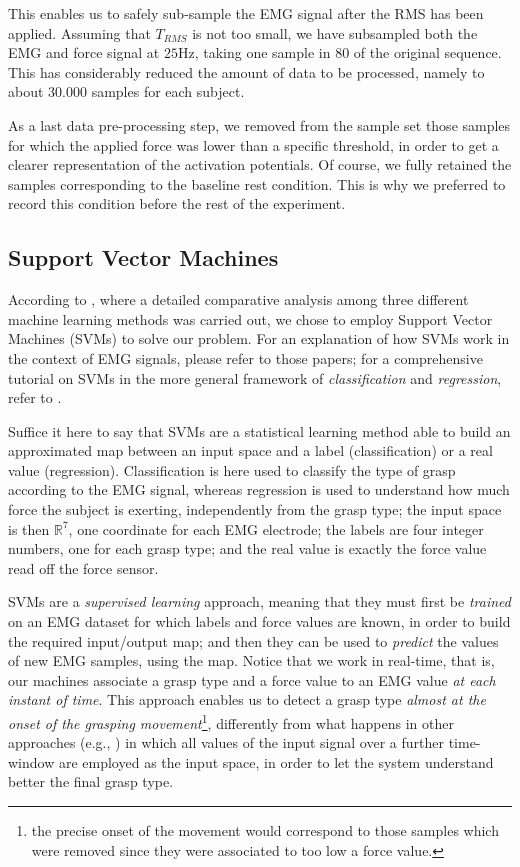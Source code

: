 \documentclass[10pt]{bmc_article}
\newenvironment{bmcformat}{\begin{raggedright}\baselineskip20pt\sloppy\setboolean{publ}{false}}{\end{raggedright}\baselineskip20pt\sloppy}
\def\RR{\mathbb{R}}
\begin{document}
\begin{bmcformat}
This enables us to safely sub-sample the EMG signal after the RMS has
been applied. Assuming that $T_{RMS}$ is not too small, we have
subsampled both the EMG and force signal at $25$Hz, taking one sample
in $80$ of the original sequence. This has considerably reduced the
amount of data to be processed, namely to about $30.000$ samples for
each subject.

As a last data pre-processing step, we removed from the sample set
those samples for which the applied force was lower than a specific
threshold, in order to get a clearer representation of the activation
potentials. Of course, we fully retained the samples corresponding to
the baseline rest condition. This is why we preferred to record this
condition before the rest of the experiment.

\subsection*{Support Vector Machines}

According to \cite{2008.ICRA,2008.BioCyb}, where a detailed
comparative analysis among three different machine learning methods
was carried out, we chose to employ Support Vector Machines (SVMs) to
solve our problem. For an explanation of how SVMs work in the context
of EMG signals, please refer to those papers; for a comprehensive
tutorial on SVMs in the more general framework of
\emph{classification} and \emph{regression}, refer to
\cite{Burges98,SmolaTut2004}.

Suffice it here to say that SVMs are a statistical learning method
able to build an approximated map between an input space and a label
(classification) or a real value (regression). Classification is here
used to classify the type of grasp according to the EMG signal,
whereas regression is used to understand how much force the subject is
exerting, independently from the grasp type; the input space is then
$\RR^7$, one coordinate for each EMG electrode; the labels are four
integer numbers, one for each grasp type; and the real value is
exactly the force value read off the force sensor.

SVMs are a \emph{supervised learning} approach, meaning that they must
first be \emph{trained} on an EMG dataset for which labels and force
values are known, in order to build the required input/output map; and
then they can be used to \emph{predict} the values of new EMG samples,
using the map. Notice that we work in real-time, that is, our machines
associate a grasp type and a force value to an EMG value \emph{at each
instant of time}. This approach enables us to detect a grasp type
\emph{almost at the onset of the grasping movement}\footnote{the
precise onset of the movement would correspond to those samples which
were removed since they were associated to too low a force value.},
differently from what happens in other approaches (e.g.,
\cite{smagt,Sebelius2005}) in which all values of the input signal over a
further time-window are employed as the input space, in order to let
the system understand better the final grasp type.


\end{bmcformat}
\end{document}
